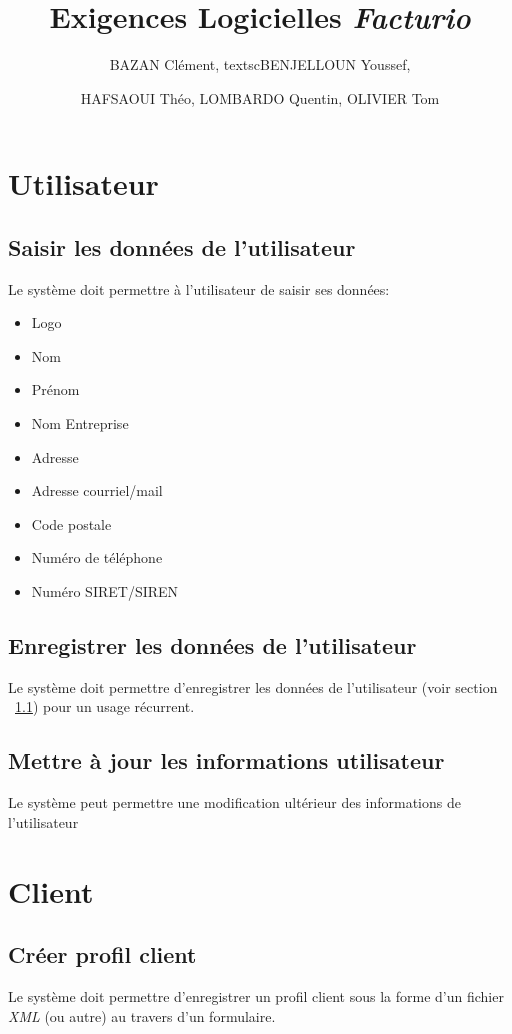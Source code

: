 \documentclass{article}
\title{\Huge{Exigences Logicielles {\em Facturio}}}
\author{\small \textsc{BAZAN} Clément, textsc{BENJELLOUN} Youssef, \and \small \textsc{HAFSAOUI} Théo, \textsc{LOMBARDO} Quentin, \textsc{OLIVIER} Tom}
\date{}
\begin{document}
\maketitle
\tableofcontents
\section{Utilisateur}
    \subsection{Saisir les données de l'utilisateur} \label{ss:sdu}
    Le  système  doit  permettre  à  l’utilisateur de saisir ses données:
    \begin{itemize}[leftmargin=0.55in]
        \item Logo
        \item Nom
        \item Prénom
        \item Nom Entreprise
        \item Adresse
        \item Adresse courriel/mail
        \item Code postale
        \item Numéro de téléphone
        \item Numéro SIRET/SIREN
    \end{itemize}
    \subsection{Enregistrer les données de l'utilisateur}
    Le système doit permettre d'enregistrer les données de l'utilisateur (voir section ~\ref{ss:sdu}) pour un usage récurrent.
    \subsection{Mettre à jour les informations utilisateur}
    Le système peut permettre une modification ultérieur des informations de l'utilisateur



\section{Client}
    \subsection{Créer profil client}\label{ss:cpc}
    
    Le système doit permettre d'enregistrer un profil client sous la forme d'un 
    fichier \emph{XML} (ou autre) au travers d'un formulaire.
    
\end{document}
